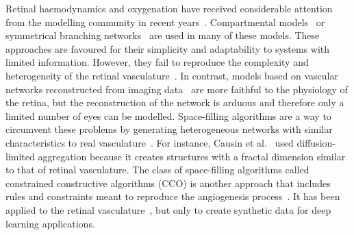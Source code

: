 \documentclass[11pt,]{article}
\begin{document}
Retinal haemodynamics and oxygenation have received considerable
attention from the modelling community in recent
years~\cite{Arciero2008,Bernabeu2014,Causin2016,Chiaravalli2022,DoblhoffDier2014,
  Fry2020,Guidoboni2014,Hernandez2023,Takahashi2009,Zhu2019,Yu2019}.
Compartmental models~\cite{Arciero2008,Guidoboni2014,Chiaravalli2022}
or symmetrical branching
networks~\cite{Chiaravalli2022,Takahashi2009,Zhu2019} are used in many
of these models. These approaches are favoured for their simplicity
and adaptability to systems with limited information. However, they
fail to reproduce the complexity and heterogeneity of the retinal
vasculature~\cite{Yu2019}. In contrast, models based on vascular
networks reconstructed from imaging data~\cite{Bernabeu2014,Fry2020}
are more faithful to the physiology of the retina, but the
reconstruction of the network is arduous and therefore only a limited
number of eyes can be modelled. Space-filling algorithms are a way to
circumvent these problems by generating heterogeneous networks with
similar characteristics to real
vasculature~\cite{Causin2016,Linninger2013,Talou2021}. For instance,
Causin et al.~\cite{Causin2016} used diffusion-limited aggregation because it creates structures with a fractal dimension similar to that of retinal vasculature.
The class of space-filling algorithms called constrained constructive algorithms
(CCO) is another approach that includes rules and constraints meant to
reproduce the angiogenesis process~\cite{Linninger2013,Talou2021}. It
has been applied to the retinal
vasculature~\cite{Brown2023,LoCastro2020}, but only to create
synthetic data for deep learning applications.
\end{document}
